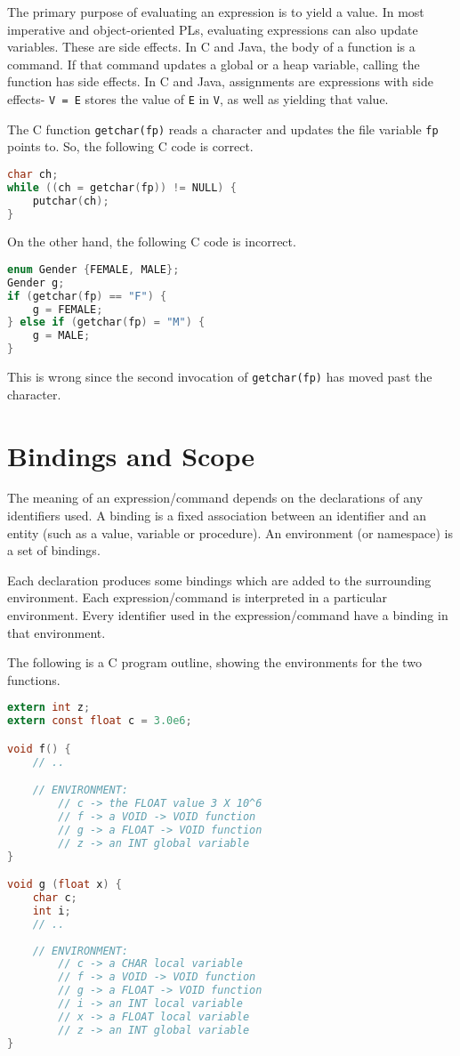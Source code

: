 \documentclass[a4paper, openany]{memoir}
\begin{document}
The primary purpose of evaluating an expression is to yield a value. In most imperative and object-oriented PLs, evaluating expressions can also update variables. These are side effects. In C and Java, the body of a function is a command. If that command updates a global or a heap variable, calling the function has side effects. In C and Java, assignments are expressions with side effects- \texttt{V = E} stores the value of \texttt{E} in \texttt{V}, as well as yielding that value.

The C function \texttt{getchar(fp)} reads a character and updates the file variable \texttt{fp} points to. So, the following C code is correct.
\begin{lstlisting}[language=C]
char ch;
while ((ch = getchar(fp)) != NULL) {
    putchar(ch);
}
\end{lstlisting}
On the other hand, the following C code is incorrect.
\begin{lstlisting}[language=C]
enum Gender {FEMALE, MALE};
Gender g;
if (getchar(fp) == "F") {
    g = FEMALE;
} else if (getchar(fp) = "M") {
    g = MALE;
}
\end{lstlisting}
\noindent This is wrong since the second invocation of \texttt{getchar(fp)} has moved past the character.
\newpage

\section{Bindings and Scope}
The meaning of an expression/command depends on the declarations of any identifiers used. A binding is a fixed association between an identifier and an entity (such as a value, variable or procedure). An environment (or namespace) is a set of bindings.

Each declaration produces some bindings which are added to the surrounding environment. Each expression/command is interpreted in a particular environment. Every identifier used in the expression/command have a binding in that environment.

The following is a C program outline, showing the environments for the two functions.
\begin{lstlisting}[language=C]
extern int z;
extern const float c = 3.0e6;

void f() {
    // ..

    // ENVIRONMENT:
        // c -> the FLOAT value 3 X 10^6
        // f -> a VOID -> VOID function
        // g -> a FLOAT -> VOID function
        // z -> an INT global variable
}

void g (float x) {
    char c;
    int i;
    // ..
    
    // ENVIRONMENT:
        // c -> a CHAR local variable
        // f -> a VOID -> VOID function
        // g -> a FLOAT -> VOID function
        // i -> an INT local variable
        // x -> a FLOAT local variable
        // z -> an INT global variable
}
\end{lstlisting}
\end{document}
